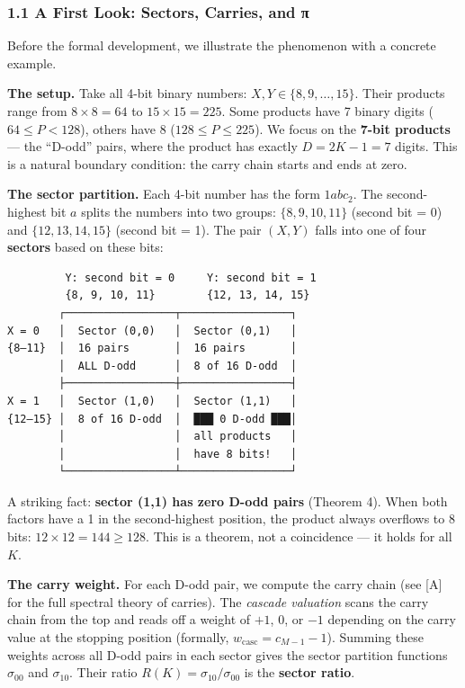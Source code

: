 \documentclass[
  11pt,
]{article}
\begin{document}
\subsubsection{1.1 A First Look: Sectors, Carries, and
π}\label{a-first-look-sectors-carries-and-ux3c0}

Before the formal development, we illustrate the phenomenon with a concrete
example.

\textbf{The setup.} Take all 4-bit binary numbers:
\(X, Y \in \lbrace{}8, 9, \ldots, 15\rbrace{}\). Their products range from
\(8 \times 8 = 64\) to \(15 \times 15 = 225\). Some products have 7 binary
digits (\(64 \leq P < 128\)), others have 8 (\(128 \leq P \leq 225\)). We focus
on the \textbf{7-bit products} --- the ``D-odd'' pairs, where the product has
exactly \(D = 2K - 1 = 7\) digits. This is a natural boundary condition: the
carry chain starts and ends at zero.

\textbf{The sector partition.} Each 4-bit number has the form \(1abc_2\). The
second-highest bit \(a\) splits the numbers into two groups:
\(\lbrace{}8, 9, 10, 11\rbrace{}\) (second bit = 0) and
\(\lbrace{}12, 13, 14, 15\rbrace{}\) (second bit = 1). The pair \((X, Y)\) falls
into one of four \textbf{sectors} based on these bits:

\begin{verbatim}
         Y: second bit = 0     Y: second bit = 1
         {8, 9, 10, 11}        {12, 13, 14, 15}
        ┌─────────────────┬─────────────────┐
X = 0   │  Sector (0,0)   │  Sector (0,1)   │
{8–11}  │  16 pairs       │  16 pairs       │
        │  ALL D-odd      │  8 of 16 D-odd  │
        ├─────────────────┼─────────────────┤
X = 1   │  Sector (1,0)   │  Sector (1,1)   │
{12–15} │  8 of 16 D-odd  │  ███ 0 D-odd ███│
        │                 │  all products   │
        │                 │  have 8 bits!   │
        └─────────────────┴─────────────────┘
\end{verbatim}

A striking fact: \textbf{sector (1,1) has zero D-odd pairs} (Theorem 4). When
both factors have a 1 in the second-highest position, the product always
overflows to 8 bits: \(12 \times 12 = 144 \geq 128\). This is a theorem, not a
coincidence --- it holds for all \(K\).

\textbf{The carry weight.} For each D-odd pair, we compute the carry chain (see
{[}A{]} for the full spectral theory of carries). The \emph{cascade valuation}
scans the carry chain from the top and reads off a weight of \(+1\), \(0\), or
\(-1\) depending on the carry value at the stopping position (formally,
\(w_{\mathrm{casc}} = c_{M-1} - 1\)). Summing these weights across all D-odd
pairs in each sector gives the sector partition functions \(\sigma_{00}\) and
\(\sigma_{10}\). Their ratio \(R(K) = \sigma_{10}/\sigma_{00}\) is the
\textbf{sector ratio}.
\end{document}

